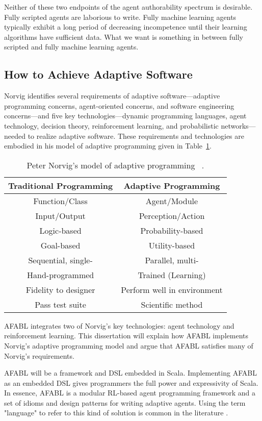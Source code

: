 Neither of these two endpoints of the agent authorability spectrum is desirable.  Fully scripted agents are laborious to write.  Fully machine learning agents typically exhibit a long period of decreasing incompetence until their learning algorithms have sufficient data.  What we want is something in between fully scripted and fully machine learning agents.

\subsection{How to Achieve Adaptive Software}

Norvig identifies several requirements of adaptive
soft\-ware---adaptive programming concerns, agent-oriented concerns,
and software engineering concerns---and five key
technologies---dynamic programming languages, agent technology,
decision theory, reinforcement learning, and probabilistic
networks---needed to realize adaptive software.  These requirements
and technologies are embodied in his model of adaptive programming
given in Table~\ref{tab:adaptive-model}.

\begin{table}[h]
\begin{tabular}{|c|c|}\hline
Traditional Programming & Adaptive Programming \\ \hline
Function/Class & Agent/Module \\
Input/Output & Perception/Action \\
Logic-based & Probability-based \\
Goal-based & Utility-based \\
Sequential, single- & Parallel, multi- \\
Hand-programmed & Trained (Learning) \\
Fidelity to designer & Perform well in environment \\
Pass test suite & Scientific method\\ \hline
\end{tabular}
\caption{Peter Norvig's model of adaptive programming
  ~\cite{norvig1998decision}.}
\label{tab:adaptive-model}
\end{table}

AFABL integrates two of Norvig's key technologies: agent technology and reinforcement learning.  This dissertation will explain how AFABL implements Norvig's adaptive programming model and argue that AFABL satisfies many of Norvig's requirements.

AFABL will be a framework and DSL embedded in Scala.  Implementing AFABL as an embedded DSL gives programmers the full power and expressivity of Scala.  In essence, AFABL is a modular RL-based agent programming framework and a set of idioms and design patterns for writing adaptive agents.  Using the term "language" to refer to this kind of solution is common in the literature \cite{andre2002state}.


